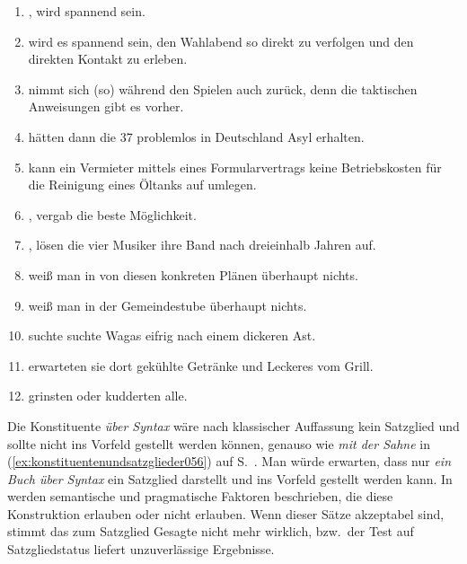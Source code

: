 \begin{enumerate}
  \item {}, wird spannend sein.
  \item \VfTest {} wird es spannend sein, den Wahlabend so direkt zu verfolgen und den direkten Kontakt zu erleben.
  \item \VfTest [Er] nimmt sich (so) während den Spielen auch zurück, denn die taktischen Anweisungen gibt es vorher.
  \item {} hätten dann die 37 problemlos in Deutschland Asyl erhalten.
  \item \VfTest {} kann ein Vermieter mittels eines Formularvertrags keine Betriebskosten für die Reinigung eines Öltanks auf umlegen.
  \item {}, vergab die beste Möglichkeit.
  \item {}, lösen die vier Musiker ihre Band nach dreieinhalb Jahren auf.
  \item \VfTest {} weiß man in von diesen konkreten Plänen überhaupt nichts.
  \item {} weiß man in der Gemeindestube überhaupt nichts.
  \item \VfTest [Um zu helfen] suchte suchte Wagas eifrig nach einem dickeren Ast.
  \item {} erwarteten sie dort gekühlte Getränke und Leckeres vom Grill.
  \item {} grinsten oder kudderten alle.
\end{enumerate}

\label{sol:konstituentenstruktur03}

Die Konstituente \textit{über Syntax} wäre nach klassischer Auffassung kein Satzglied und sollte nicht ins Vorfeld gestellt werden können, genauso wie \textit{mit der Sahne} in (\ref{ex:konstituentenundsatzglieder056}) auf S.~\pageref{ex:konstituentenundsatzglieder056}.
Man würde erwarten, dass nur \textit{ein Buch über Syntax} ein Satzglied darstellt und ins Vorfeld gestellt werden kann.
In \citet{Dekuthy2002} werden semantische und pragmatische Faktoren beschrieben, die diese Konstruktion erlauben oder nicht erlauben.
Wenn dieser Sätze akzeptabel sind, stimmt das zum Satzglied Gesagte nicht mehr wirklich, bzw.\ der Test auf Satzgliedstatus liefert unzuverlässige Ergebnisse.

